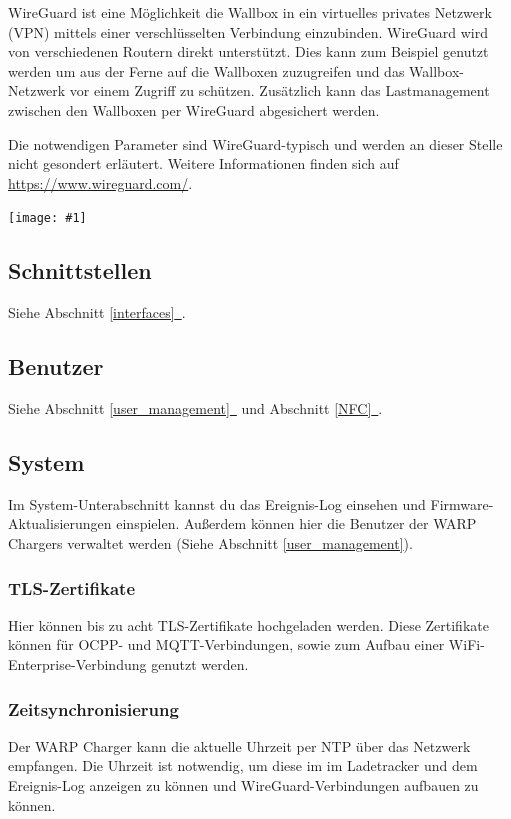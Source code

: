 \documentclass[a4paper,10pt]{article}
\newcommand{\gfx}[1]{\texttt{[image: \#1]}}
\newcommand*{\fullref}[1]{Abschnitt \hyperref[{#1}]{\ref*{#1}~\nameref*{#1}}}
\begin{document}
\begin{multicols*}{2}
    WireGuard ist eine Möglichkeit die Wallbox in ein virtuelles privates Netzwerk (VPN)
    mittels einer verschlüsselten Verbindung einzubinden. WireGuard wird von
    verschiedenen Routern direkt unterstützt. Dies kann zum Beispiel genutzt
    werden um aus der Ferne auf die Wallboxen zuzugreifen und das
    Wallbox-Netzwerk vor einem Zugriff zu schützen. Zusätzlich kann das
    Lastmanagement zwischen den Wallboxen per WireGuard abgesichert werden.

    Die notwendigen Parameter sind WireGuard-typisch und werden an dieser Stelle
    nicht gesondert erläutert. Weitere Informationen finden sich auf
    \url{https://www.wireguard.com/}.

    \gfx{./img_warp2/resized/web_wireguard}

    \subsection{Schnittstellen}
    Siehe \fullref{interfaces}.

    \subsection{Benutzer}
    Siehe \fullref{user_management} und \fullref{NFC}.

    \subsection{System}
    Im System-Unterabschnitt kannst du das Ereignis-Log einsehen und Firmware-Aktualisierungen einspielen.
    Außerdem können hier die Benutzer der WARP Chargers verwaltet werden (Siehe
    Abschnitt \ref{user_management}).

    \subsubsection{TLS-Zertifikate}\label{tls}
    Hier können bis zu acht TLS-Zertifikate hochgeladen werden. Diese Zertifikate können
    für OCPP- und MQTT-Verbindungen, sowie zum Aufbau einer WiFi-Enterprise-Verbindung genutzt werden.

    \subsubsection{Zeitsynchronisierung}\label{ntp}
    Der WARP Charger kann die aktuelle Uhrzeit per NTP über das Netzwerk empfangen.
    Die Uhrzeit ist notwendig, um diese im im Ladetracker und dem Ereignis-Log anzeigen zu können und
    WireGuard-Verbindungen aufbauen zu können.


\end{multicols*}
\end{document}
